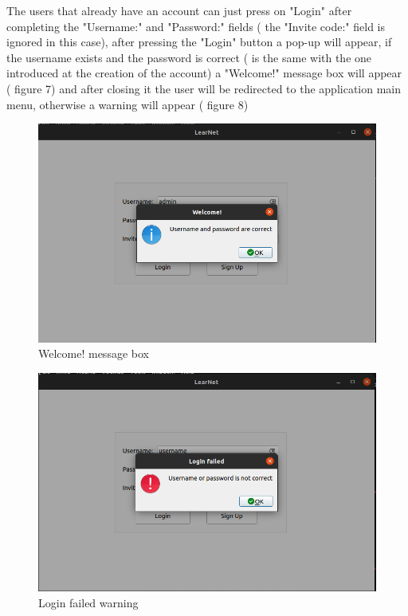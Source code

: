 \documentclass[runningheads]{llncs}
\begin{document}
The users that already have an account can just press on "Login" after completing the "Username:" and "Password:" fields ( the "Invite code:" field is ignored in this case), after pressing the "Login" button a pop-up will appear, if the username exists and the password is correct ( is the same with the one introduced at the creation of the account) a "Welcome!" message box will appear ( figure 7) and after closing it the user will be redirected to the application main menu, otherwise a warning will appear ( figure 8)
\newpage

\begin{figure}[H]
\includegraphics[width=\textwidth,height=\textheight,keepaspectratio]{images/correctUsernameOrPassword.png}
\caption{Welcome! message box}
\end{figure}


\begin{figure}[H]
\includegraphics[width=\textwidth,height=\textheight,keepaspectratio]{images/incorrectUsernameOrPassword.png}
\caption{Login failed warning}
\end{figure}
\end{document}
